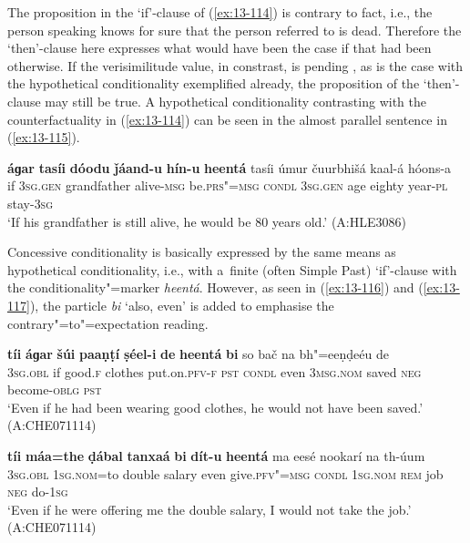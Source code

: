 The proposition in the `if'-clause of (\ref{ex:13-114}) is contrary to fact, i.e., the person speaking knows for sure that the person referred to is dead. Therefore the `then'-clause here expresses what would have been the case if that had been otherwise. If the verisimilitude value, in constrast, is pending \citep[332]{givon2001b}, as is the case with the hypothetical conditionality exemplified already, the proposition of the `then'-clause may still be true. A hypothetical conditionality contrasting with the counterfactuality in (\ref{ex:13-114}) can be seen in the almost parallel sentence in (\ref{ex:13-115}).

\begin{exe}
\ex
\label{ex:13-115}
\gll \textbf{áɡar} \textbf{tasíi} \textbf{dóodu} \textbf{ǰáand-u} \textbf{hín-u} \textbf{ heentá} tasíi úmur čuurbhišá kaal-á hóons-a \\
if \textsc{3sg.gen} grandfather alive-\textsc{msg} be.\textsc{prs"=msg}  \textsc{condl} \textsc{3sg.gen} age eighty year-\textsc{pl} stay-\textsc{3sg} \\
\glt `If his grandfather is still alive, he would be 80 years old.' (A:HLE3086) 
\end{exe}

 Concessive conditionality is basically expressed by the same means as hypothetical conditionality, i.e., with a~finite (often Simple Past) `if'-clause with the conditionality"=marker \textit{heentá}. However, as seen in (\ref{ex:13-116}) and (\ref{ex:13-117}), the particle \textit{bi} `also, even' is added to emphasise the contrary"=to"=expectation reading. 

\begin{exe}
\ex
\label{ex:13-116}
\gll \textbf{tíi} \textbf{áɡar} \textbf{šúi} \textbf{paaṇṭí} \textbf{ṣéel-i} \textbf{de} \textbf{heentá} \textbf{ bi} so bač na bh"=eeṇḍeéu de  \\
\textsc{3sg.obl} if good.\textsc{f} clothes put.on.\textsc{pfv-f} \textsc{pst} \textsc{condl}  even \textsc{3msg.nom} saved \textsc{neg} become-\textsc{oblg} \textsc{pst} \\
\glt `Even if he had been wearing good clothes, he would not have been saved.' (A:CHE071114)

\ex
\label{ex:13-117}
\gll \textbf{tíi} \textbf{máa=the} \textbf{ḍábal} \textbf{tanxaá} \textbf{bi} \textbf{dít-u} \textbf{ heentá} ma eesé nookarí na th-úum \\
\textsc{3sg.obl} \textsc{1sg.nom}=to double salary even give.\textsc{pfv"=msg}  \textsc{condl } \textsc{1sg.nom} \textsc{rem} job \textsc{neg} do-\textsc{1sg} \\
\glt `Even if he were offering me the double salary, I would not take the job.' (A:CHE071114)
\end{exe}

